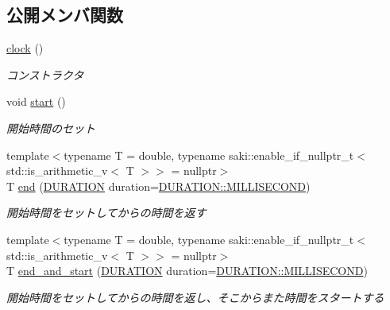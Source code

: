 \subsection*{公開メンバ関数}
\begin{DoxyCompactItemize}
\item 
\mbox{\hyperlink{classsaki_1_1clock_aec6aa6ad43fcc8f992f7ee9a25e25354}{clock}} ()
\begin{DoxyCompactList}\small\item\em コンストラクタ \end{DoxyCompactList}\item 
void \mbox{\hyperlink{classsaki_1_1clock_ad8c77a4865ba0a3840c640014887a0e3}{start}} ()
\begin{DoxyCompactList}\small\item\em 開始時間のセット \end{DoxyCompactList}\item 
{\footnotesize template$<$typename T  = double, typename saki\+::enable\+\_\+if\+\_\+nullptr\+\_\+t$<$ std\+::is\+\_\+arithmetic\+\_\+v$<$ T $>$$>$  = nullptr$>$ }\\T \mbox{\hyperlink{classsaki_1_1clock_a9d74b8b909a93d819452f175b41d57e4}{end}} (\mbox{\hyperlink{classsaki_1_1clock_a33900ca0b3320bafb061928ad6827bdf}{D\+U\+R\+A\+T\+I\+ON}} duration=\mbox{\hyperlink{classsaki_1_1clock_a33900ca0b3320bafb061928ad6827bdfa241d7907de05ad50c011812e927cd671}{D\+U\+R\+A\+T\+I\+O\+N\+::\+M\+I\+L\+L\+I\+S\+E\+C\+O\+ND}})
\begin{DoxyCompactList}\small\item\em 開始時間をセットしてからの時間を返す \end{DoxyCompactList}\item 
{\footnotesize template$<$typename T  = double, typename saki\+::enable\+\_\+if\+\_\+nullptr\+\_\+t$<$ std\+::is\+\_\+arithmetic\+\_\+v$<$ T $>$$>$  = nullptr$>$ }\\T \mbox{\hyperlink{classsaki_1_1clock_a593da66eb6ce690e20e6602eecfa2b1e}{end\+\_\+and\+\_\+start}} (\mbox{\hyperlink{classsaki_1_1clock_a33900ca0b3320bafb061928ad6827bdf}{D\+U\+R\+A\+T\+I\+ON}} duration=\mbox{\hyperlink{classsaki_1_1clock_a33900ca0b3320bafb061928ad6827bdfa241d7907de05ad50c011812e927cd671}{D\+U\+R\+A\+T\+I\+O\+N\+::\+M\+I\+L\+L\+I\+S\+E\+C\+O\+ND}})
\begin{DoxyCompactList}\small\item\em 開始時間をセットしてからの時間を返し、そこからまた時間をスタートする \end{DoxyCompactList}\end{DoxyCompactItemize}


